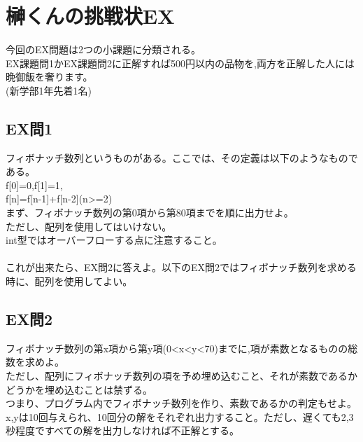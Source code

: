 \documentclass[a4j,titlepage,dvipdfmx]{jsarticle}   %
\begin{document}
\section{榊くんの挑戦状EX}
今回のEX問題は2つの小課題に分類される。\\
EX課題問1かEX課題問2に正解すれば500円以内の品物を,両方を正解した人には晩御飯を奢ります。\\
(新学部1年先着1名)\\

\subsection{EX問1}
フィボナッチ数列というものがある。ここでは、その定義は以下のようなものである。\\
f[0]=0,f[1]=1,\\
f[n]=f[n-1]+f[n-2](n>=2)\\
まず、フィボナッチ数列の第0項から第80項までを順に出力せよ。\\
ただし、配列を使用してはいけない。\\
int型ではオーバーフローする点に注意すること。\\
\\
これが出来たら、EX問2に答えよ。以下のEX問2ではフィボナッチ数列を求める時に、配列を使用してよい。\\

\subsection{EX問2}
フィボナッチ数列の第x項から第y項(0<x<y<70)までに,項が素数となるものの総数を求めよ。\\
ただし、配列にフィボナッチ数列の項を予め埋め込むこと、それが素数であるかどうかを埋め込むことは禁ずる。\\
つまり、プログラム内でフィボナッチ数列を作り、素数であるかの判定もせよ。\\
x,yは10回与えられ、10回分の解をそれぞれ出力すること。ただし、遅くても2,3秒程度ですべての解を出力しなければ不正解とする。\\
\end{document}
